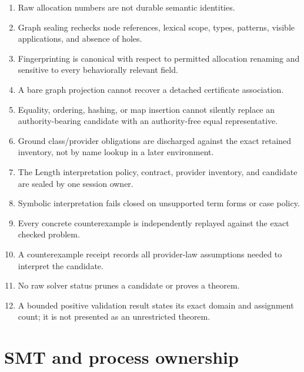 \documentclass[10pt,letterpaper,oneside]{report}
\begin{document}
\begin{enumerate}
  \item Raw allocation numbers are not durable semantic identities.
  \item Graph sealing rechecks node references, lexical scope, types, patterns, visible applications, and absence of holes.
  \item Fingerprinting is canonical with respect to permitted allocation renaming and sensitive to every behaviorally relevant field.
  \item A bare graph projection cannot recover a detached certificate association.
  \item Equality, ordering, hashing, or map insertion cannot silently replace an authority-bearing candidate with an authority-free equal representative.
  \item Ground class/provider obligations are discharged against the exact retained inventory, not by name lookup in a later environment.
  \item The Length interpretation policy, contract, provider inventory, and candidate are sealed by one session owner.
  \item Symbolic interpretation fails closed on unsupported term forms or case policy.
  \item Every concrete counterexample is independently replayed against the exact checked problem.
  \item A counterexample receipt records all provider-law assumptions needed to interpret the candidate.
  \item No raw solver status prunes a candidate or proves a theorem.
  \item A bounded positive validation result states its exact domain and assignment count; it is not presented as an unrestricted theorem.
\end{enumerate}

\section{SMT and process ownership}
\end{document}
